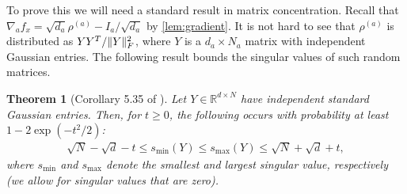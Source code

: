\documentclass{article}
\newtheorem{theorem}{Theorem}
\DeclarePairedDelimiter{\norm}{\lVert}{\rVert}
\newcommand{\R}{{\mathbb{R}}}
\newcommand\samp{x}
\begin{document}
To prove this we will need a standard result in matrix concentration.
Recall that $\nabla_a f_{\samp} = \sqrt{d_a} \rho^{(a)} - I_a/\sqrt{d_a}$ by \cref{lem:gradient}.
It is not hard to see that $\rho^{(a)}$ is distributed as $Y Y^T / \norm{Y}_F^2$, where $Y$ is a $d_a \times N_a$ matrix with independent Gaussian entries.
The following result bounds the singular values of such random matrices.

\begin{theorem}[Corollary 5.35 of \cite{vershynin2010introduction}]\label{cor:vershynin}
Let $Y \in \R^{d \times N}$ have independent standard Gaussian entries.
Then, for $t \geq 0$, the following occurs with probability at least $1 - 2 \exp(-t^{2}/2)$:
\begin{align*}
  \sqrt{N} - \sqrt{d} - t \leq s_{\min}(Y) \leq s_{\max}(Y) \leq \sqrt{N} + \sqrt{d} + t,
\end{align*}
where $s_{\min}$ and $s_{\max}$ denote the smallest and largest singular value, respectively (we allow for singular values that are zero).
\end{theorem}
\end{document}
